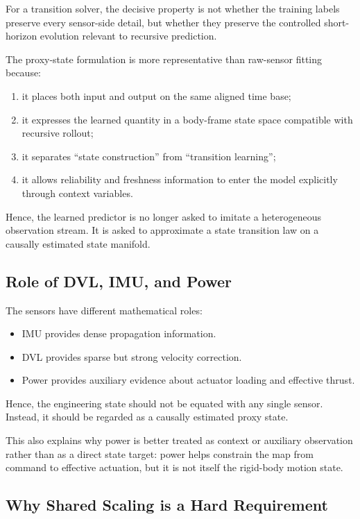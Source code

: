 For a transition solver, the decisive property is not whether the training labels preserve every sensor-side detail,
but whether they preserve the controlled short-horizon evolution relevant to recursive prediction.

The proxy-state formulation is more representative than raw-sensor fitting because:
\begin{enumerate}
\item it places both input and output on the same aligned time base;
\item it expresses the learned quantity in a body-frame state space compatible with recursive rollout;
\item it separates ``state construction'' from ``transition learning'';
\item it allows reliability and freshness information to enter the model explicitly through context variables.
\end{enumerate}

Hence, the learned predictor is no longer asked to imitate a heterogeneous observation stream.
It is asked to approximate a state transition law on a causally estimated state manifold.

\subsection{Role of DVL, IMU, and Power}

The sensors have different mathematical roles:

\begin{itemize}
\item IMU provides dense propagation information.
\item DVL provides sparse but strong velocity correction.
\item Power provides auxiliary evidence about actuator loading and effective thrust.
\end{itemize}

Hence, the engineering state should not be equated with any single sensor.
Instead, it should be regarded as a causally estimated proxy state.

This also explains why power is better treated as context or auxiliary observation rather than as a direct state target:
power helps constrain the map from command to effective actuation, but it is not itself the rigid-body motion state.

\subsection{Why Shared Scaling is a Hard Requirement}

